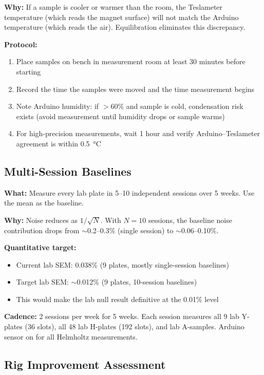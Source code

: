 \documentclass[11pt,letterpaper]{article}
\begin{document}
\textbf{Why:} If a sample is cooler or warmer than the room, the Teslameter
temperature (which reads the magnet surface) will not match the Arduino
temperature (which reads the air). Equilibration eliminates this discrepancy.

\textbf{Protocol:}
\begin{enumerate}[nosep]
  \item Place samples on bench in measurement room at least 30 minutes before
    starting
  \item Record the time the samples were moved and the time measurement begins
  \item Note Arduino humidity: if $>$60\% and sample is cold, condensation risk
    exists (avoid measurement until humidity drops or sample warms)
  \item For high-precision measurements, wait 1 hour and verify
    Arduino--Teslameter agreement is within \SI{0.5}{\degreeCelsius}
\end{enumerate}


\subsection{Multi-Session Baselines}
\label{sec:imp-baselines}

\textbf{What:} Measure every lab plate in 5--10 independent sessions over 5
weeks. Use the mean as the baseline.

\textbf{Why:} Noise reduces as $1/\sqrt{N}$. With $N=10$ sessions, the baseline
noise contribution drops from ${\sim}$0.2--0.3\% (single session) to
${\sim}$0.06--0.10\%.

\textbf{Quantitative target:}
\begin{itemize}[nosep]
  \item Current lab SEM: 0.038\% (9 plates, mostly single-session baselines)
  \item Target lab SEM: ${\sim}$0.012\% (9 plates, 10-session baselines)
  \item This would make the lab null result definitive at the 0.01\% level
\end{itemize}

\textbf{Cadence:} 2 sessions per week for 5 weeks. Each session measures all 9
lab Y-plates (36 slots), all 48 lab H-plates (192 slots), and lab A-samples.
Arduino sensor on for all Helmholtz measurements.


\subsection{Rig Improvement Assessment}
\label{sec:imp-rig}
\end{document}

